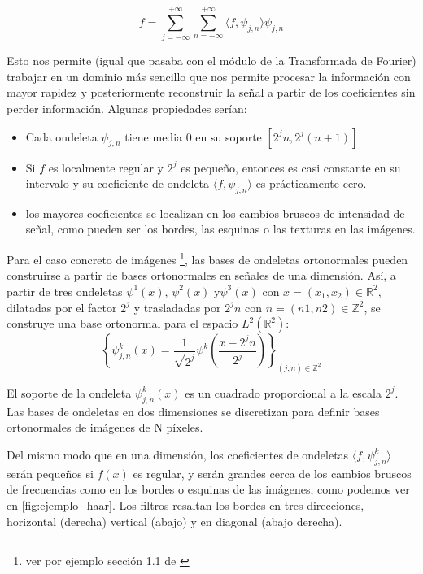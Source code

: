 $$f=\sum_{j=-\infty}^{+\infty}\sum_{n=-\infty}^{+\infty}  \langle f,\psi_{j,n} \rangle \psi_{j,n} $$

\noindent Esto nos permite (igual que pasaba con el módulo de la Transformada de Fourier) trabajar en un dominio más sencillo que nos permite procesar la información con mayor rapidez y posteriormente reconstruir la señal a partir de los coeficientes sin perder información. Algunas propiedades serían: 

\begin{itemize}
  \item Cada ondeleta $\psi_{j,n}$ tiene media $0$ en su soporte $[2^jn, 2^j(n+1)]$.
  \item Si $f$ es localmente regular y $2^j$ es pequeño, entonces es casi constante en su intervalo y su coeficiente de ondeleta $\langle f,\psi_{j,n} \rangle$ es prácticamente cero.
  \item los mayores coeficientes se localizan en los cambios bruscos de intensidad de señal, como pueden ser los bordes, las esquinas o las texturas en las imágenes.
\end{itemize}

\noindent Para el caso concreto de imágenes \footnote{ver por ejemplo sección 1.1 de \cite{MallatWavelets}}, las bases de ondeletas ortonormales pueden construirse a partir de bases ortonormales en señales de una dimensión. Así, a partir de tres ondeletas $\psi^1(x)$, $\psi^2(x)$ y$\psi^3(x)$ con $x=(x_1,x_2)\in \mathbb{R}^2$, dilatadas por el factor $2^j$ y trasladadas por $2^jn$ con $n=(n1,n2)\in \mathbb{Z}^2$, se construye una base ortonormal para el espacio $L^2(\mathbb{R}^2)$: 
$$\left \lbrace \psi_{j,n}^k(x)= \frac{1}{\sqrt{2^j}} \psi^k\left(\frac{x-2^jn}{2^j}\right) \right \rbrace_{(j,n) \in \mathbb{Z}^2}$$

\medskip

\noindent El soporte de la ondeleta $\psi_{j,n}^k(x)$ es un cuadrado proporcional a la escala $2^j$. Las bases de ondeletas en dos dimensiones se discretizan para definir bases ortonormales de imágenes de N píxeles.


\noindent Del mismo modo que en una dimensión, los coeficientes de ondeletas $\langle f,\psi_{j,n}^k \rangle$ serán pequeños si $f(x)$ es regular, y serán grandes cerca de los cambios bruscos de frecuencias como en los bordes o esquinas de las imágenes, como podemos ver en \autoref{fig:ejemplo_haar}. Los filtros resaltan los bordes en tres direcciones, horizontal (derecha) vertical (abajo) y en diagonal (abajo derecha).

